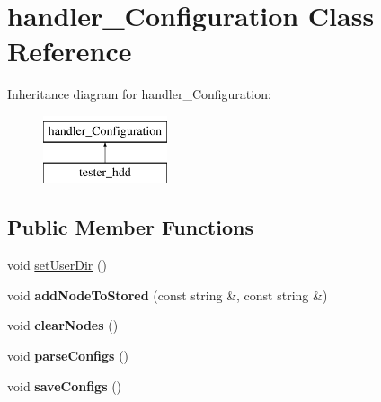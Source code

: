 \hypertarget{classhandler__Configuration}{
\section{handler\_\-Configuration Class Reference}
\label{classhandler__Configuration}
}
Inheritance diagram for handler\_\-Configuration:\begin{figure}[H]
\begin{center}
\leavevmode
\includegraphics[height=2cm]{classhandler__Configuration}
\end{center}
\end{figure}
\subsection*{Public Member Functions}
\begin{DoxyCompactItemize}
\item 
void \hyperlink{classhandler__Configuration_a9f850565461949dbb96f6cc5028618c1}{setUserDir} ()
\item 
\hypertarget{classhandler__Configuration_a3f22615c739d1445edcf578762ea6772}{
void {\bfseries addNodeToStored} (const string \&, const string \&)}
\label{classhandler__Configuration_a3f22615c739d1445edcf578762ea6772}

\item 
\hypertarget{classhandler__Configuration_abcaa51f67c80dce0b76a9fee5c19b59a}{
void {\bfseries clearNodes} ()}
\label{classhandler__Configuration_abcaa51f67c80dce0b76a9fee5c19b59a}

\item 
\hypertarget{classhandler__Configuration_a3dc84c5be06ae0caa5c53954842e407f}{
void {\bfseries parseConfigs} ()}
\label{classhandler__Configuration_a3dc84c5be06ae0caa5c53954842e407f}

\item 
\hypertarget{classhandler__Configuration_ab7b078c0151a3c1efba8d2079cefcce8}{
void {\bfseries saveConfigs} ()}
\label{classhandler__Configuration_ab7b078c0151a3c1efba8d2079cefcce8}

\end{DoxyCompactItemize}
